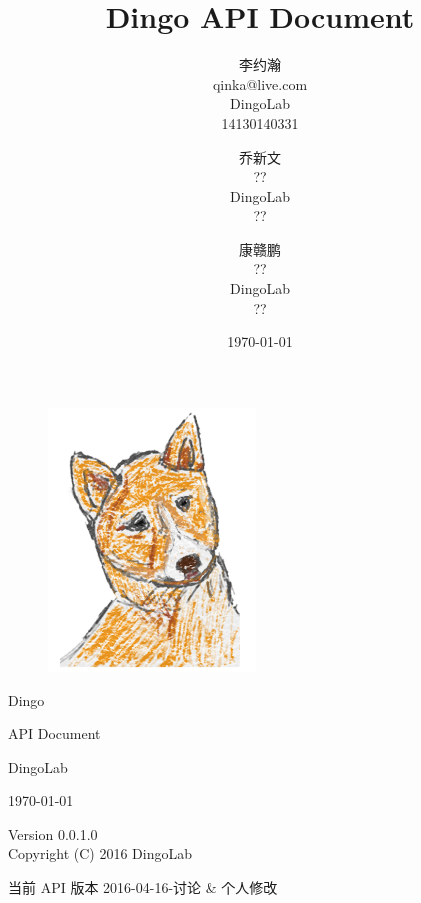 \documentclass[UTF8]{article}
\author{ 李约瀚 \\ qinka@live.com \\ DingoLab \\ 14130140331 %
    \and 乔新文 \\ ?? \\ DingoLab \\ ??                      %
    \and 康赣鹏 \\ ?? \\ DingoLab \\ ??                      %
    }
\title{\Huge Dingo API Document}
\date{\mdydate\today}
\def\version{0.0.1.0}
\begin{document}
    \thispagestyle{empty} 
    {
    \label{page:cover}
    \hspace*{-10em} 
    \begin{figure}
        \includegraphics[width=5.5cm]{./Dingo-A}
    \end{figure}
    \begin{center}
        \vspace*{5em}
        {\hspace*{13em}\fontsize{90pt}{99pt}\selectfont Dingo}
    \end{center}
    \begin{center}
        \vspace*{2em}
        {\Huge API Document}
    \end{center}
    \vfill
    \begin{flushright}
        {\huge DingoLab}
    \end{flushright}
    \begin{flushright}
        {\Large \mydate\today}
    \end{flushright}
    }
    \label{page:title}
    \maketitle
    \thispagestyle{empty} 
    \vfill
    \begin{center}
        Version \version\\
        Copyright (C) 2016 DingoLab
    \end{center}
    \newpage
    \setcounter{page}{1}
    \tableofcontents
    \newpage
    \setcounter{page}{1}
    当前 API 版本 2016-04-16-讨论 \& 个人修改
\end{document}
